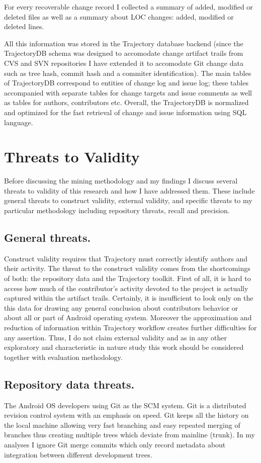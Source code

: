 \documentclass[a4paper,10pt]{article}
\numberwithin{equation}{subsection}
\begin{document}
For every recoverable change record I collected a summary of added, modified or deleted files 
as well as a summary about LOC changes: added, modified or deleted lines.

All this information was stored in the Trajectory database backend (since the TrajectoryDB schema
was designed to accomodate change artifact trails from CVS and SVN repositories I have extended
it to accomodate Git change data such as tree hash, commit hash and a commiter identification).
The main tables of TrajectoryDB correspond to entities of change log and issue log; these tables 
accompanied with separate tables for change targets and issue comments as well as tables for
authors, contributors etc. Overall, the TrajectoryDB is normalized and optimized for the fast 
retrieval of change and issue information using SQL language.

\section{Threats to Validity}
Before discussing the mining methodology and my findings I discuss several threats to validity 
of this research and how I have addressed them. These include general threats to construct 
validity, external validity, and specific threats to my particular methodology including 
repository threats, recall and precision. 

\subsection{General threats.}
Construct validity requires that Trajectory must correctly identify authors and their activity.
The threat to the construct validity comes from the shortcomings of both: the repository data and
the Trajectory toolkit. First of all, it is hard to access how much of the contributor's activity 
devoted to the project is actually captured within the artifact trails. Certainly, it is 
insufficient to look only on the this data for drawing any general conclusion about contributors 
behavior or about all or part of Android operating system. Moreover the approximation and reduction 
of information within Trajectory workflow creates further difficulties for any assertion. Thus,
I do not claim external validity and as in any other exploratory and characteristic in nature 
study this work should be considered together with evaluation methodology.

\subsection{Repository data threats.}
The Android OS developers using Git as the SCM system. Git is a distributed revision control system 
with an emphasis on speed. Git keeps all the history on the local machine allowing very fast 
branching and easy repeated merging of branches thus creating multiple trees which deviate from 
mainline (trunk). In my analyses I ignore Git merge commits which only record metadata about 
integration between different development trees. 
\end{document}
